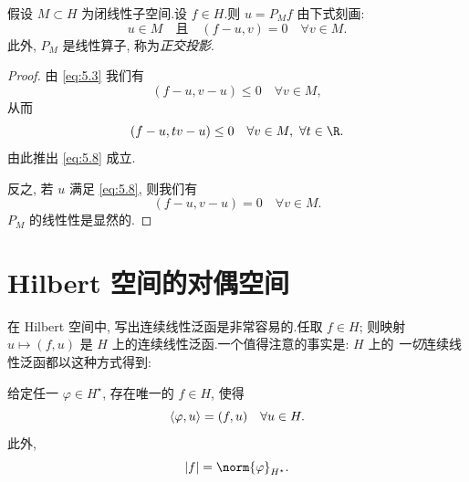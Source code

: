 \begin{corollary}
\label{cor:5.4}
假设 $M\subset H$ 为闭线性子空间.设 $f\in H$.则 $u=P_Mf$ 由下式刻画:
\begin{equation}
\boxed{u\in M\quad\text{且}\quad(f-u,v)=0\quad\forall v\in M.}
\label{eq:5.8}
\end{equation}
此外, $P_M$ 是线性算子, 称为\emph{正交投影}.
\end{corollary}

\begin{proof}
由 \eqref{eq:5.3} 我们有
\begin{equation*}
(f-u,v-u)\le0\quad\forall v\in M,
\end{equation*}
从而
\begin{equation*}
(f-u,tv-u)\le0\quad\forall v\in M,\ \forall t\in\R.
\end{equation*}
由此推出 \eqref{eq:5.8} 成立.

反之, 若 $u$ 满足 \eqref{eq:5.8}, 则我们有
\begin{equation*}
(f-u,v-u)=0\quad\forall v\in M.
\end{equation*}
$P_M$ 的线性性是显然的.
\end{proof}
\section{Hilbert 空间的对偶空间}
\label{sec:5.2}

在 Hilbert 空间中, 写出连续线性泛函是非常容易的.任取 $f\in H$; 则映射
$u\mapsto(f,u)$ 是 $H$ 上的连续线性泛函.一个值得注意的事实是: $H$ 上的
\emph{一切}连续线性泛函都以这种方式得到:

\begin{keytheorem}
\label{thm:5.5}
给定任一 $\varphi\in H^\star$, 存在唯一的 $f\in H$, 使得
\begin{equation*}
\left\langle \varphi,u\right\rangle=(f,u)\quad\forall u\in H.
\end{equation*}
此外,
\begin{equation*}
\abs{f}=\norm{\varphi}_{H^\star}.
\end{equation*}
\end{keytheorem}


